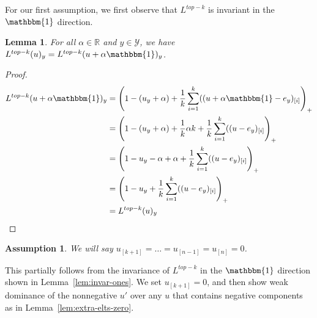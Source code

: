 \documentclass[12pt]{article}
\newcommand{\reals}{\mathbb{R}}
\newcommand{\Y}{\mathcal{Y}}
\newcommand{\ones}{\mathbbm{1}}
\newtheorem{lemma}{Lemma}
\newtheorem{assumption}{Assumption}
\begin{document}
For our first assumption, we first observe that $L^{top-k}$ is invariant in the $\ones$ direction.
\begin{lemma}
	For all $\alpha \in \reals$ and $y\in\Y$, we have $L^{top-k}(u)_y = L^{top-k}(u + \alpha \ones)_y$.
\end{lemma}
\begin{proof}\label{lem:invar-ones}
	\begin{align*}
	L^{top-k}(u + \alpha \ones)_y &= \left(1 - (u_y + \alpha) + \frac{1}{k} \sum_{i=1}^k ((u + \alpha \ones  - e_y)_{[i]} \right)_+\\
	&= \left(1 - (u_y + \alpha) +\frac{1}{k} \alpha k + \frac{1}{k} \sum_{i=1}^k ((u - e_y)_{[i]} \right)_+\\
	&= \left(1 -u_y - \alpha + \alpha + \frac{1}{k} \sum_{i=1}^k ((u - e_y)_{[i]} \right)_+\\
	&= \left(1 -u_y + \frac{1}{k} \sum_{i=1}^k ((u - e_y)_{[i]} \right)_+\\
	&= L^{top-k}(u)_y
	\end{align*}
\end{proof}

\begin{assumption}\label{assum:nonneg}
	We will say $u_{[k+1]} = \ldots = u_{[n-1]} = u_{[n]} = 0$.
\end{assumption}
This partially follows from the invariance of $L^{top-k}$ in the $\ones$ direction shown in Lemma~\ref{lem:invar-ones}.
We set $u_{[k+1]} = 0$, and then show weak dominance of the nonnegative $u'$ over any $u$ that contains negative components as in Lemma~\ref{lem:extra-elts-zero}.
\end{document}
